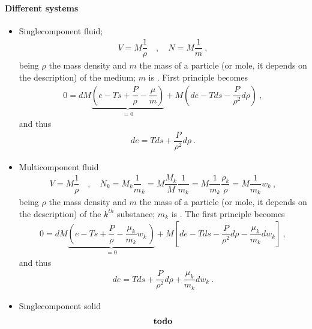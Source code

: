 \documentclass[letterpaper,10pt,english]{jupyterBook}
\begin{document}
\paragraph{Different systems}
\label{\detokenize{ch/potentials:different-systems}}\begin{itemize}
\item {} 
\sphinxAtStartPar
Single\sphinxhyphen{}component fluid;
\begin{equation*}
\begin{split}V = M \dfrac{1}{\rho} \quad , \quad N = M \dfrac{1}{m} \ , \end{split}
\end{equation*}
\sphinxAtStartPar
being \(\rho\) the mass density and \(m\) the mass of a particle (or mole, it depends on the description) of the medium; \(m\) is . First principle becomes
\begin{equation*}
\begin{split}0 = d M \underbrace{\left( e - T s + \dfrac{P}{\rho} - \dfrac{\mu}{m} \right)}_{= 0} + M \left( d e - T ds - \dfrac{P}{\rho^2} d\rho \right) \ ,\end{split}
\end{equation*}
\sphinxAtStartPar
and thus
\begin{equation*}
\begin{split}de = T ds + \dfrac{P}{\rho^2} d \rho \ .\end{split}
\end{equation*}
\item {} 
\sphinxAtStartPar
Multi\sphinxhyphen{}component fluid
\begin{equation*}
\begin{split}V = M \dfrac{1}{\rho} \quad , \quad N_k = M_k \dfrac{1}{m}_k = M \dfrac{M_k}{M} \dfrac{1}{m_k} = M \dfrac{1}{m_k} \dfrac{\rho_k}{\rho} = M \dfrac{1}{m_k} w_k \ , \end{split}
\end{equation*}
\sphinxAtStartPar
being \(\rho\) the mass density and \(m\) the mass of a particle (or mole, it depends on the description) of the \(k^{th}\) substance; \(m_k\) is . The first principle becomes
\begin{equation*}
\begin{split}0 = d M \underbrace{\left( e - T s + \dfrac{P}{\rho} - \dfrac{\mu_k}{m_k} w_k \dfrac{}{} \right)}_{= 0} + M \left[ d e - T ds - \dfrac{P}{\rho^2} d\rho - \dfrac{\mu_k}{m_k} d w_k \right] \ ,\end{split}
\end{equation*}
\sphinxAtStartPar
and thus
\begin{equation*}
\begin{split}de = T ds + \dfrac{P}{\rho^2} d \rho + \dfrac{\mu_k}{m_k} d w_k\ .\end{split}
\end{equation*}
\item {} 
\sphinxAtStartPar
Single\sphinxhyphen{}component solid
\begin{equation*}
\begin{split}\text{\textbf{todo}}\end{split}
\end{equation*}
\end{itemize}
\end{document}

